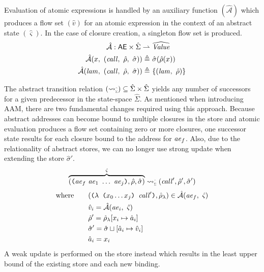 Evaluation of atomic expressions is handled by an auxiliary function $(\hat{\mathcal{A}})$ which produces a flow set $(\hat{v})$
for an atomic expression in the context of an abstract state $(\hat{\varsigma})$.
%
In the case of closure creation, a singleton flow set is produced.
%
\begin{align*}
  \hat{\mathcal{A}} : \mathsf{AE} \times \hat{\Sigma} \rightharpoonup&\ \widehat{\var{Value}} 
  \\
  \hat{\mathcal{A}}(x,\ (\var{call},\ \hat{\rho},\ \hat{\sigma})) \defas&\ \hat{\sigma}(\hat{\rho}(x)) 
  \\
  \hat{\mathcal{A}}(\var{lam},\ (\var{call},\ \hat{\rho},\ \hat{\sigma})) \defas&\ \Set{(\var{lam},\ \hat{\rho})} 
\end{align*}


The abstract transition relation $(\pdTo) \subseteq \hat{\Sigma} \times \hat{\Sigma}$ yields any number of successors for a given predecessor in the state-space $\hat{\Sigma}$.
%
As mentioned when introducing AAM, there are two fundamental changes required using this approach. 
%
Because abstract addresses can become bound to multiple closures in the store and atomic evaluation produces a flow set containing zero or more closures, one successor state
results for each closure bound to the address for $\mathit{ae}_f$.
%
Also, due to the relationality of abstract stores, we can no longer use strong update when extending the store $\hat{\sigma}'$.
%
\begin{align*} 
  \overbrace{(\sexpr{\var{ae}_f\ \var{ae}_1\ \ldots\ \var{ae}_j}, \hat{\rho}, \hat{\sigma})}^{\hat{\varsigma}} 
  \pdTo 
  (\var{call}', \hat{\rho}', \hat{\sigma}')
\end{align*}
\vspace{-0.5cm}
\begin{align*}
  \textrm{where} \ \ \ \ \ \ & (\texttt{($\lambda$\ (}x_0 \ldots x_j\texttt{)\ }\mathit{call}'\texttt{)}, \hat{\rho}_\lambda) \in \hat{\mathcal{A}}(\mathit{ae}_f,\ \hat{\varsigma}) 
  \\
  & \hat{v}_i = \hat{\mathcal{A}}(\mathit{ae}_i,\ \hat{\varsigma})  
  \\
  & \hat{\rho}' = \hat{\rho}_\lambda [ x_i \mapsto \hat{a}_i ]
  \\
  & \hat{\sigma}' = \hat{\sigma} \sqcup [ \hat{a}_i \mapsto \hat{v}_i ]
  \\
  & \hat{a}_i = x_i
\end{align*}
%
A weak update is performed on the store instead which results in the least upper bound of the existing store and each new binding.
